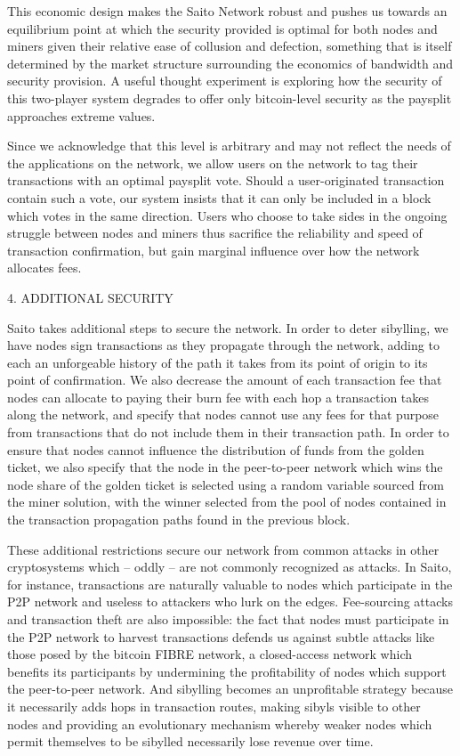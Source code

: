 \documentclass[11.5pt, oneside]{article}   	%
\begin{document}
\begin{multicols}{2}
This economic design makes the Saito Network robust and pushes us towards an equilibrium point at which the security provided is optimal for both nodes and miners given their relative ease of collusion and defection, something that is itself determined by the market structure surrounding the economics of bandwidth and security provision. A useful thought experiment is exploring how the security of this two-player system degrades to offer only bitcoin-level security as the paysplit approaches extreme values.

Since we acknowledge that this level is arbitrary and may not reflect the needs of the applications on the network, we allow users on the network to tag their transactions with an optimal paysplit vote. Should a user-originated transaction contain such a vote, our system insists that it can only be included in a block which votes in the same direction. Users who choose to take sides in the ongoing struggle between nodes and miners thus sacrifice the reliability and speed of transaction confirmation, but gain marginal influence over how the network allocates fees.

4. ADDITIONAL SECURITY

Saito takes additional steps to secure the network. In order to deter sibylling, we have nodes sign transactions as they propagate through the network, adding to each an unforgeable history of the path it takes from its point of origin to its point of confirmation. We also decrease the amount of each transaction fee that nodes can allocate to paying their burn fee with each hop a transaction takes along the network, and specify that nodes cannot use any fees for that purpose from transactions that do not include them in their transaction path. In order to ensure that nodes cannot influence the distribution of funds from the golden ticket, we also specify that the node in the peer-to-peer network which wins the node share of the golden ticket is selected using a random variable sourced from the miner solution, with the winner selected from the pool of nodes contained in the transaction propagation paths found in the previous block.

These additional restrictions secure our network from common attacks in other cryptosystems which -- oddly -- are not commonly recognized as attacks. In Saito, for instance, transactions are naturally valuable to nodes which participate in the P2P network and useless to attackers who lurk on the edges. Fee-sourcing attacks and transaction theft are also impossible: the fact that nodes must participate in the P2P network to harvest transactions defends us against subtle attacks like those posed by the bitcoin FIBRE network, a closed-access network which benefits its participants by undermining the profitability of nodes which support the peer-to-peer network. And sibylling becomes an unprofitable strategy because it necessarily adds hops in transaction routes, making sibyls visible to other nodes and providing an evolutionary mechanism whereby weaker nodes which permit themselves to be sibylled necessarily lose revenue over time. 


\end{multicols}
\end{document}
